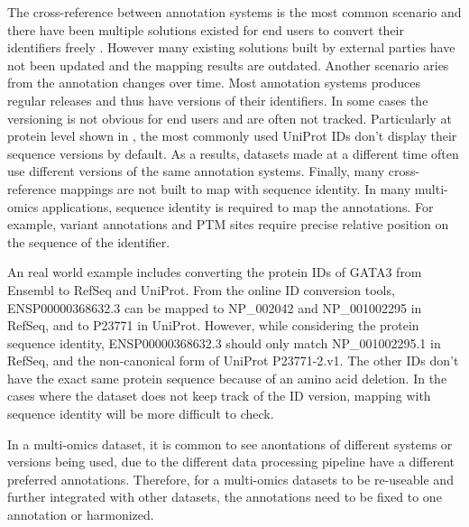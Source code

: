 The cross-reference between annotation systems is the most common scenario and there have been multiple solutions existed for end users to convert their identifiers freely \cite{shermanbt_lempickira:DAVIDKnowledgebase2007, zhangj_kasprzyka:BioMartData2011, smedleyd_kasprzyka:BioMartCommunity2015}.
However many existing solutions built by external parties have not been updated and the mapping results are outdated.
Another scenario aries from the annotation changes over time.
Most annotation systems produces regular releases and thus have versions of their identifiers.
In some cases the versioning is not obvious for end users and are often not tracked.
Particularly at protein level shown in , the most commonly used UniProt IDs don't display their sequence versions by default.
As a results, datasets made at a different time often use different versions of the same annotation systems.
Finally, many cross-reference mappings are not built to map with sequence identity.
In many multi-omics applications, sequence identity is required to map the annotations.
For example, variant annotations and PTM sites require precise relative position on the sequence of the identifier.

An real world example includes converting the protein IDs of GATA3 from Ensembl to RefSeq and UniProt.
From the online ID conversion tools, ENSP00000368632.3 can be mapped to NP\_002042 and NP\_001002295 in RefSeq, and to P23771 in UniProt.
However, while considering the protein sequence identity, ENSP00000368632.3 should only match NP\_001002295.1 in RefSeq, and the non-canonical form of UniProt P23771-2.v1.
The other IDs don't have the exact same protein sequence because of an amino acid deletion.
In the cases where the dataset does not keep track of the ID version, mapping with sequence identity will be more difficult to check.

In a multi-omics dataset, it is common to see anontations of different systems or versions being used, due to the different data processing pipeline have a different preferred annotations.
Therefore, for a multi-omics datasets to be re-useable and further integrated with other datasets, the annotations need to be fixed to one annotation or harmonized.



